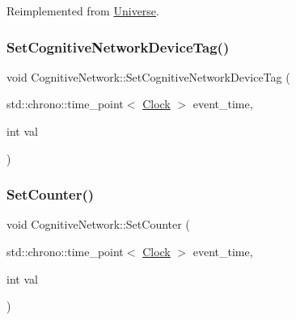 Reimplemented from \mbox{\hyperlink{classUniverse_a3b3da7c86a7b75e5e5c0b7972ac82a87}{Universe}}.

\mbox{\label{classCognitiveNetwork_a0e8a64151a2446fc16a074ad2de325df}} 
\subsubsection{\texorpdfstring{Set\+Cognitive\+Network\+Device\+Tag()}{SetCognitiveNetworkDeviceTag()}}
{\footnotesize\ttfamily void Cognitive\+Network\+::\+Set\+Cognitive\+Network\+Device\+Tag (\begin{DoxyParamCaption}\item[{std\+::chrono\+::time\+\_\+point$<$ \mbox{\hyperlink{universe_8h_a0ef8d951d1ca5ab3cfaf7ab4c7a6fd80}{Clock}} $>$}]{event\+\_\+time,  }\item[{int}]{val }\end{DoxyParamCaption})\hspace{0.3cm}{\ttfamily [inline]}}

\mbox{\label{classCognitiveNetwork_a23c6a11d9f15a141f69a9779f174bfb3}} 
\subsubsection{\texorpdfstring{Set\+Counter()}{SetCounter()}}
{\footnotesize\ttfamily void Cognitive\+Network\+::\+Set\+Counter (\begin{DoxyParamCaption}\item[{std\+::chrono\+::time\+\_\+point$<$ \mbox{\hyperlink{universe_8h_a0ef8d951d1ca5ab3cfaf7ab4c7a6fd80}{Clock}} $>$}]{event\+\_\+time,  }\item[{int}]{val }\end{DoxyParamCaption})\hspace{0.3cm}{\ttfamily [inline]}}

\mbox{\label{classCognitiveNetwork_ac29e676c84244f5b64c0083a0efead28}} 
